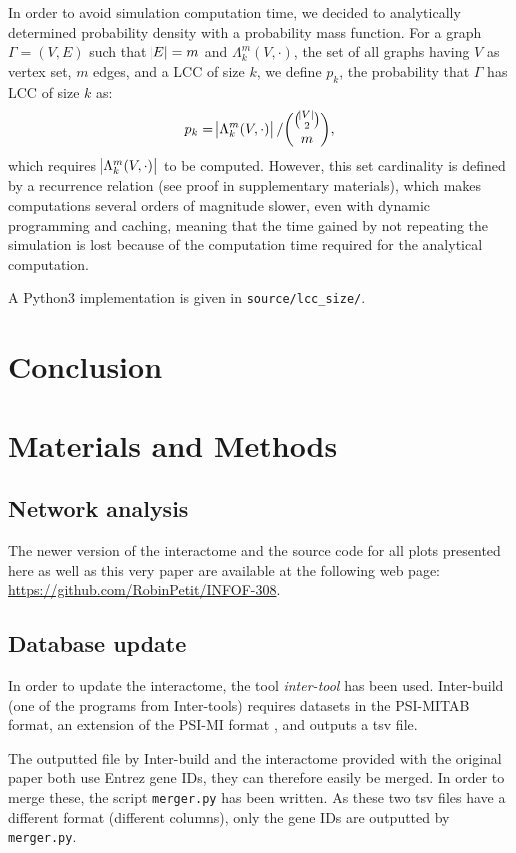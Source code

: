 \documentclass[letterpaper]{article}
\begin{document}
In order to avoid simulation computation time, we decided to analytically determined probability density
with a probability mass function. For a graph $\Gamma = (V, E)$ such that $\abs E = m$ and
$\Lambda_k^m(V, \cdot)$, the set of all graphs having $V$ as vertex set, $m$ edges, and a LCC of size $k$,
we define $p_k$, the probability that $\Gamma$ has LCC of size $k$ as:
\begin{equation}
	p_k = \abs {\Lambda_k^m(V, \cdot)}/\binom {\binom {\abs V}2}m,
\end{equation}
which requires $\abs {\Lambda_k^m(V, \cdot)}$ to be computed. However, this set cardinality is defined by a
recurrence relation (see proof in supplementary materials), which makes computations several orders of
magnitude slower, even with dynamic programming and caching, meaning that the time gained by not repeating
the simulation is lost because of the computation time required for the analytical computation.

A Python3 implementation is given in \texttt{source/lcc\_size/}.

\section{Conclusion}

\section{Materials and Methods}
	\subsection{Network analysis}
	The newer version of the interactome and the source code for all plots presented here as well as this
	very paper are available at the following web page: \url{https://github.com/RobinPetit/INFOF-308}.

	\subsection{Database update}
	In order to update the interactome, the tool \textit{inter-tool} \citep{inter-tools} has been used.
	Inter-build (one of the programs from Inter-tools) requires datasets in the PSI-MITAB format, an extension of the
	PSI-MI format \citep{MITABFormat}, and outputs a tsv file.

	The outputted file by Inter-build and the interactome provided with the original paper both use Entrez
	gene IDs, they can therefore easily be merged. In order to merge these, the script \texttt{merger.py}
	has been written. As these two tsv files have a different format (different columns), only the gene IDs
	are outputted by \texttt{merger.py}.
\end{document}

